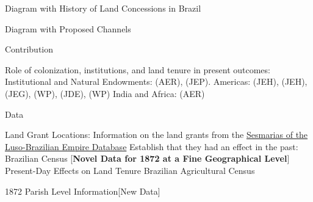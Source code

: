 \documentclass[aspectratio=1610]{beamer}
\begin{document}
\begin{frame}{Diagram with History of Land Concessions in Brazil}
    
\end{frame}

\begin{frame}{Diagram with Proposed Channels}
    
\end{frame}

\begin{frame}{Contribution}
    \begin{outline}
        \1 Role of colonization, institutions, and land tenure in present outcomes:
            \vspace{2mm}
            \2 Institutional and Natural Endowments: \cite{Acemoglu2001-dz} (AER), \cite{Sokoloff2000-mb} (JEP). 
            \vspace{2mm}
            \2 Americas: \cite{Naritomi2012-or} (JEH), 
            \cite{Musacchio2014-pq} (JEH),
            \cite{Wigton-Jones2020-ex} (JEG),
            \cite{Laudares2022-vy} (WP),
            \cite{Sellars2018-yp} (JDE),
            \cite{Smith2023-ip} (WP)
            \vspace{2mm}
            \2 India and Africa: 
            \cites{Banerjee2005-ki} (AER)
    \end{outline}
\end{frame}

\begin{frame}{Data}
    \begin{outline}
        \1 Land Grant Locations:
            \2 Information on the land grants from the \href{http://plataformasilb.cchla.ufrn.br/}{Sesmarias of the Luso-Brazilian Empire Database}
        \vspace{2mm}
        \1 Establish that they had an effect in the past:
             Brazilian Census [\textbf{Novel Data for 1872 at a Fine Geographical Level}]
        \vspace{2mm}
        \1 Present-Day Effects on Land Tenure
             Brazilian Agricultural Census
    \end{outline}
\end{frame}

\begin{frame}{1872 Parish Level Information}{[New Data]}
    \begin{figure}[h!]
        \begin{center}
        \end{center}
        \label{fig:parishes_1872}
      \end{figure}
\end{frame}
\end{document}
